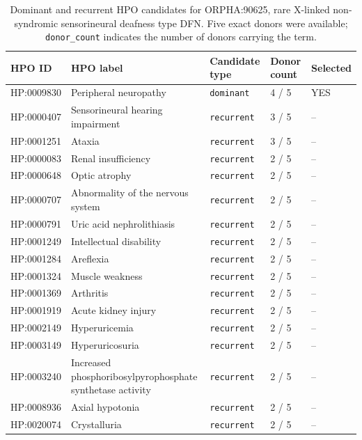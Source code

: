 \begin{table}[htbp]
\centering
\caption{Dominant and recurrent HPO candidates for ORPHA:90625, rare X-linked non-syndromic sensorineural deafness type DFN. Five exact donors were available; \texttt{donor\_count} indicates the number of donors carrying the term.}
\label{tab:supp_hpo_orpha90625}
\scriptsize
\setlength{\tabcolsep}{4pt}
\renewcommand{\arraystretch}{1.1}
\begin{tabularx}{\textwidth}{@{}p{}X p{}p{}p{}@{}}
\toprule
\textbf{HPO ID} & \textbf{HPO label} & \textbf{Candidate type} & \textbf{Donor count} & \textbf{Selected}  \\
\midrule
HP:0009830 & Peripheral neuropathy & \texttt{dominant} & 4 / 5 & YES \\
HP:0000407 & Sensorineural hearing impairment & \texttt{recurrent} & 3 / 5 & -- \\
HP:0001251 & Ataxia & \texttt{recurrent} & 3 / 5 & -- \\
HP:0000083 & Renal insufficiency & \texttt{recurrent} & 2 / 5 & -- \\
HP:0000648 & Optic atrophy & \texttt{recurrent} & 2 / 5 & -- \\
HP:0000707 & Abnormality of the nervous system & \texttt{recurrent} & 2 / 5 & -- \\
HP:0000791 & Uric acid nephrolithiasis & \texttt{recurrent} & 2 / 5 & -- \\
HP:0001249 & Intellectual disability & \texttt{recurrent} & 2 / 5 & -- \\
HP:0001284 & Areflexia & \texttt{recurrent} & 2 / 5 & -- \\
HP:0001324 & Muscle weakness & \texttt{recurrent} & 2 / 5 & -- \\
HP:0001369 & Arthritis & \texttt{recurrent} & 2 / 5 & -- \\
HP:0001919 & Acute kidney injury & \texttt{recurrent} & 2 / 5 & -- \\
HP:0002149 & Hyperuricemia & \texttt{recurrent} & 2 / 5 & -- \\
HP:0003149 & Hyperuricosuria & \texttt{recurrent} & 2 / 5 & -- \\
HP:0003240 & Increased phosphoribosylpyrophosphate synthetase activity & \texttt{recurrent} & 2 / 5 & -- \\
HP:0008936 & Axial hypotonia & \texttt{recurrent} & 2 / 5 & -- \\
HP:0020074 & Crystalluria & \texttt{recurrent} & 2 / 5 & -- \\
\bottomrule
\end{tabularx}
\end{table}

